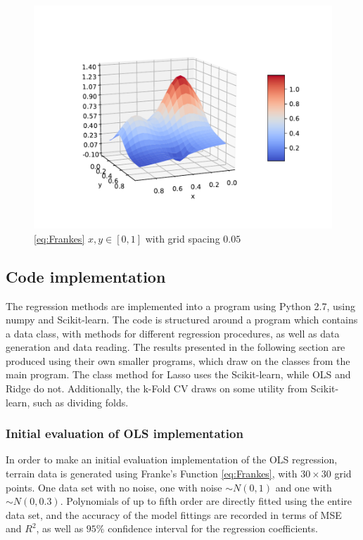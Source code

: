 \documentclass[%
oneside,                 %
final,                   %
10pt]{article}
\begin{document}
\begin{figure}[!h]
        \centering 
         \includegraphics[scale=0.7]{../Results/Part_a/frankeplot.pdf} 
        \caption{\eqref{eq:Frankes} $x,y\in [0,1]$ with grid spacing $0.05$}
        \label{fig:franke}   
\end{figure}  
\subsection{Code implementation}
The regression methods are implemented into a program using Python 2.7, using numpy and Scikit-learn. The code is structured around a program which contains a data class, with methods for different regression procedures, as well as data generation and data reading. The results presented in the following section are produced using their own smaller programs, which draw on the classes from the main program. The class method for Lasso uses the Scikit-learn, while OLS and Ridge do not. Additionally, the k-Fold CV draws on some utility from Scikit-learn, such as dividing folds.

\subsubsection{Initial evaluation of OLS implementation}
In order to make an initial evaluation implementation of the OLS regression, terrain data is generated using Franke's Function \eqref{eq:Frankes}, with $30 \times 30$ grid points. One data set with no noise, one with noise $\sim N(0,1)$ and one with $\sim N(0,0.3)$. Polynomials of up to fifth order are directly fitted using the entire data set, and the accuracy of the model fittings are recorded in terms of MSE and $R^2$, as well as $95\%$ confidence interval for the regression coefficients. 
\end{document}
